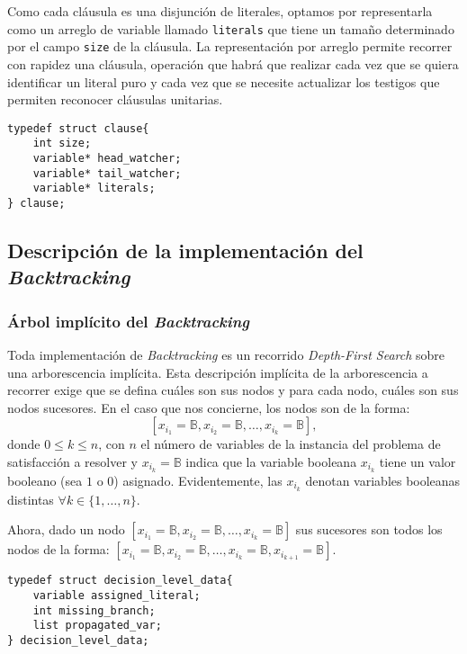\documentclass[12pt,lettersize]{article}
\begin{document}
Como cada cláusula es una disjunción de literales, optamos por representarla
como un arreglo de variable llamado {\tt literals} que tiene un tamaño
determinado por el campo {\tt size} de la cláusula. La representación por
arreglo permite recorrer con rapidez una cláusula, operación que habrá que
realizar cada vez que se quiera identificar un literal puro y cada vez que se
necesite actualizar los testigos que permiten reconocer cláusulas unitarias.

\begin{lstlisting}
typedef struct clause{
    int size;
    variable* head_watcher;
    variable* tail_watcher;
    variable* literals;
} clause;
\end{lstlisting}

\subsection{Descripción de la implementación del \emph{Backtracking}}
\subsubsection{\'Arbol implícito del \emph{Backtracking}}\label{backtracking}
Toda implementación de \emph{Backtracking} es un recorrido \emph{Depth-First
  Search} sobre una arborescencia implícita. Esta descripción implícita de la
arborescencia a recorrer exige que se defina cuáles son sus nodos y para cada
nodo, cuáles son sus nodos sucesores. En el caso que nos concierne, los nodos
son de la forma:
\[[x_{i_1}=\mathbb{B},x_{i_2}=\mathbb{B},\ldots, x_{i_k} = \mathbb{B} ], \]
donde $0\leq k \leq n$, con $n$ el número de variables de la instancia del
problema de satisfacción a resolver y $x_{i_k}=\mathbb{B}$ indica que la
variable booleana $x_{i_k}$ tiene un valor booleano (sea $1$ o $0$) asignado. Evidentemente, las
$x_{i_k}$ denotan variables booleanas distintas $\forall k \in \{1,\ldots,n\}$.

Ahora, dado un nodo $[x_{i_1}=\mathbb{B},x_{i_2}=\mathbb{B},\ldots, x_{i_k} =
\mathbb{B} ]$ sus sucesores son todos los nodos de la forma:
$[x_{i_1}=\mathbb{B},x_{i_2}=\mathbb{B},\ldots, x_{i_k} = \mathbb{B},
x_{i_{k+1}}=\mathbb{B} ]$.


\begin{lstlisting}
typedef struct decision_level_data{
    variable assigned_literal;
    int missing_branch;                                                
    list propagated_var;
} decision_level_data;
\end{lstlisting}
\end{document}
